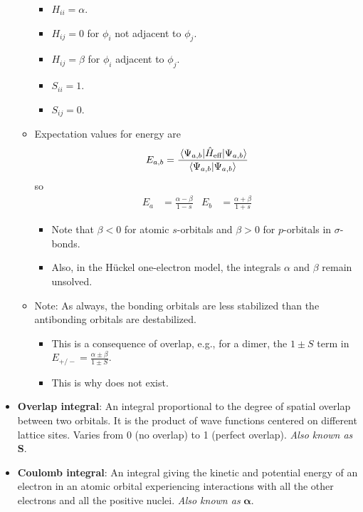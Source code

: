 \documentclass[../notes.tex]{subfiles}
\begin{document}
\begin{itemize}
\begin{itemize}
        \begin{itemize}
            \item $H_{ii}=\alpha$.
            \item $H_{ij}=0$ for $\phi_i$ not adjacent to $\phi_j$.
            \item $H_{ij}=\beta$ for $\phi_i$ adjacent to $\phi_j$.
            \item $S_{ii}=1$.
            \item $S_{ij}=0$.
        \end{itemize}
        \item Expectation values for energy are
        \begin{equation*}
            E_{a,b} = \frac{\ev{\hat{H}_\text{eff}}{\Psi_{a,b}}}{\bra{\Psi_{a,b}}\ket{\Psi_{a,b}}}
        \end{equation*}
        so
        \begin{align*}
            E_a &= \frac{\alpha-\beta}{1-s}&
                E_b &= \frac{\alpha+\beta}{1+s}
        \end{align*}
        \begin{itemize}
            \item Note that $\beta<0$ for atomic $s$-orbitals and $\beta>0$ for $p$-orbitals in $\sigma$-bonds.
            \item Also, in the H\"{u}ckel one-electron model, the integrals $\alpha$ and $\beta$ remain unsolved.
        \end{itemize}
        \item Note: As always, the bonding orbitals are less stabilized than the antibonding orbitals are destabilized.
        \begin{itemize}
            \item This is a consequence of overlap, e.g., for a dimer, the $1\pm S$ term in $E_{+/-}=\frac{\alpha\pm\beta}{1\pm S}$.
            \item This is why  does not exist.
        \end{itemize}
    \end{itemize}
    \item \textbf{Overlap integral}: An integral proportional to the degree of spatial overlap between two orbitals. It is the product of wave functions centered on different lattice sites. Varies from 0 (no overlap) to 1 (perfect overlap). \emph{Also known as} $\bm{S}$.
    \item \textbf{Coulomb integral}: An integral giving the kinetic and potential energy of an electron in an atomic orbital experiencing interactions with all the other electrons and all the positive nuclei. \emph{Also known as} $\bm{\alpha}$.

\end{itemize}
\end{document}
